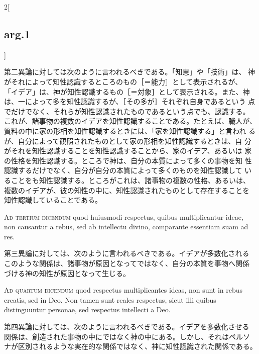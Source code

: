 \documentclass[paper=a4paper,fontsize=10pt,jafontsize=9pt,titlepage]{jlreq}
\begin{document}
\begin{paracol}{2}[\subsection{arg.1}]
\switchcolumn

第二異論に対しては次のように言われるべきである。「知恵」や「技術」は、
神がそれによって知性認識するところのもの［＝能力］として表示されるが、
「イデア」は、神が知性認識するもの［＝対象］として表示される。また、神
は、一によって多を知性認識するが、［その多が］それぞれ自身であるという
点でだけでなく、それらが知性認識されたものであるという点でも、認識する。
これが、諸事物の複数のイデアを知性認識することである。たとえば、職人が、
質料の中に家の形相を知性認識するときには、「家を知性認識する」と言われ
るが、自分によって観照されたものとして家の形相を知性認識するときは、自
分がそれを知性認識することを知性認識することから、家のイデア、あるいは
家の性格を知性認識する。ところで神は、自分の本質によって多くの事物を知
性認識するだけでなく、自分が自分の本質によって多くのものを知性認識して
いることをも知性認識する。ところがこれは、諸事物の複数の性格、あるいは、
複数のイデアが、彼の知性の中に、知性認識されたものとして存在することを
知性認識していることである。

\switchcolumn*[\subsection{ad.3}]

{\scshape Ad tertium dicendum} quod huiusmodi respectus, quibus
multiplicantur ideae, non causantur a rebus, sed ab intellectu divino,
comparante essentiam suam ad res.

\switchcolumn

第三異論に対しては、次のように言われるべきである。イデアが多数化される
このような関係は、諸事物が原因となってではなく、自分の本質を事物へ関係
づける神の知性が原因となって生じる。

\switchcolumn*[\subsection{ad.4}]

{\scshape Ad quartum dicendum} quod respectus multiplicantes ideas,
non sunt in rebus creatis, sed in Deo. Non tamen sunt reales
respectus, sicut illi quibus distinguuntur personae, sed respectus
intellecti a Deo.

\switchcolumn

第四異論に対しては、次のように言われるべきである。イデアを多数化させる
関係は、創造された事物の中にではなく神の中にある。しかし、それはペルソ
ナが区別されるような実在的な関係ではなく、神に知性認識された関係である。

\end{paracol}
\newpage
\end{document}
